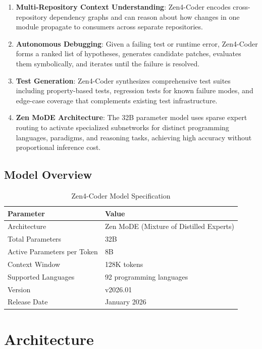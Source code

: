 \documentclass[11pt,a4paper]{article}
\begin{document}
\begin{enumerate}
  \item \textbf{Multi-Repository Context Understanding}: Zen4-Coder encodes cross-repository dependency graphs and can reason about how changes in one module propagate to consumers across separate repositories.
  \item \textbf{Autonomous Debugging}: Given a failing test or runtime error, Zen4-Coder forms a ranked list of hypotheses, generates candidate patches, evaluates them symbolically, and iterates until the failure is resolved.
  \item \textbf{Test Generation}: Zen4-Coder synthesizes comprehensive test suites including property-based tests, regression tests for known failure modes, and edge-case coverage that complements existing test infrastructure.
  \item \textbf{Zen MoDE Architecture}: The 32B parameter model uses sparse expert routing to activate specialized subnetworks for distinct programming languages, paradigms, and reasoning tasks, achieving high accuracy without proportional inference cost.
\end{enumerate}

\subsection{Model Overview}

\begin{table}[H]
\centering
\caption{Zen4-Coder Model Specification}
\begin{tabular}{ll}
\toprule
\textbf{Parameter} & \textbf{Value} \\
\midrule
Architecture & Zen MoDE (Mixture of Distilled Experts) \\
Total Parameters & 32B \\
Active Parameters per Token & 8B \\
Context Window & 128K tokens \\
Supported Languages & 92 programming languages \\
Version & v2026.01 \\
Release Date & January 2026 \\
\bottomrule
\end{tabular}
\end{table}

\section{Architecture}
\end{document}

